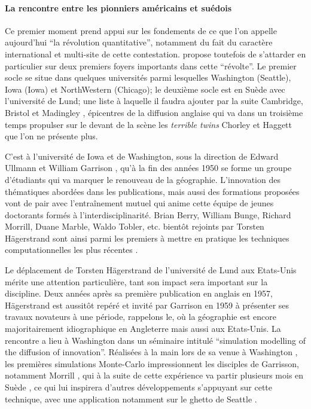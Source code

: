 \paragraph{La rencontre entre les pionniers américains et suédois}

Ce premier moment prend appui sur les fondements de ce que l'on appelle aujourd'hui \enquote{la révolution quantitative}, notamment du fait du caractère international et multi-site de cette contestation. \textcite{Gould2004} propose toutefois de s'attarder en particulier sur deux premiers foyers importants dans cette \enquote{révolte}. Le premier socle se situe dans quelques universités \autocite{Gould2004} parmi lesquelles Washington (Seattle), Iowa (Iowa) et NorthWestern (Chicago); le deuxième socle est en Suède avec l'université de Lund; une liste à laquelle il faudra ajouter par la suite Cambridge, Bristol et Madingley \autocite{Haggett1989}, épicentres de la diffusion anglaise \autocites{Whitehand1970} qui va dans un troisième temps propulser sur le devant de la scène les \textit{terrible twins} Chorley et Haggett que l'on ne présente plus.

C'est à l'université de Iowa et de Washington, sous la direction de Edward Ullmann et William Garrison , qu'à la fin des années 1950 se forme un groupe d'étudiants qui va marquer le renouveau de la géographie. L'innovation des thématiques abordées dans les publications, mais aussi des formations proposées vont de pair avec l’entraînement mutuel qui anime cette équipe de jeunes doctorants formés à l'interdisciplinarité. Brian Berry, William Bunge, Richard Morrill, Duane Marble, Waldo Tobler, etc. bientôt rejoints par Torsten Hägerstrand sont ainsi parmi les premiers à mettre en pratique les techniques computationnelles les plus récentes . 

Le déplacement de Torsten Hägerstrand de l'université de Lund aux Etats-Unis mérite une attention particulière, tant son impact sera important sur la discipline. Deux années après sa première publication en anglais en 1957, Hägerstrand est aussitôt repéré et invité par Garrison en 1959 à présenter ses travaux novateurs à une période, rappelons le, où la géographie est encore majoritairement idiographique en Angleterre mais aussi aux Etats-Unis. La rencontre a lieu à Washington dans un séminaire intitulé \foreignquote{english}{simulation modelling of the diffusion of innovation}. Réalisées à la main lors de sa venue à Washington , les premières simulations Monte-Carlo  impressionnent les disciples de Garrisson, notamment Morrill \autocite[120]{Unwin1992}, qui à la suite de cette expérience va partir plusieurs mois en Suède \autocite{Morril2005}, ce qui lui inspirera d'autres développements s'appuyant sur cette technique, avec une application notamment sur le ghetto de Seattle \autocite{Marble1972}.

